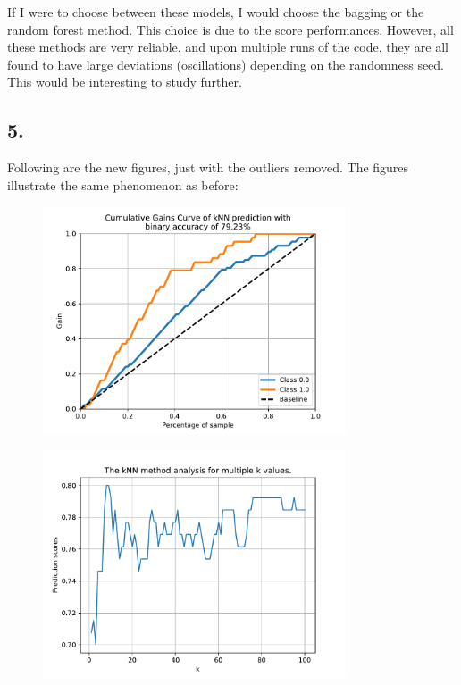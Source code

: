 \documentclass[]{article}
\begin{document}
If I were to choose between these models, I would choose the bagging or the random forest method. This choice is due to the score performances. However, all these methods are very reliable, and upon multiple runs of the code, they are all found to have large deviations (oscillations) depending on the randomness seed. This would be interesting to study further.


\subsection*{5.}
Following are the new figures, just with the outliers removed. The figures illustrate the same phenomenon as before:
\begin{figure}[H]
	\centering
	\includegraphics[width=0.8\textwidth]{figures/LASTONE.pdf}
	\label{fig:LASTONE}
\end{figure}
\begin{figure}[H]
	\centering
	\includegraphics[width=0.8\textwidth]{figures/LASTTWO.pdf}
	\label{fig:LASTTWO}
\end{figure}
\end{document}

